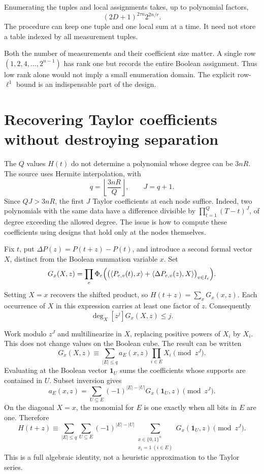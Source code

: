 \documentclass[11pt,a4paper]{article}
\numberwithin{equation}{section}
\theoremstyle{definition}
\theoremstyle{remark}
\newcommand{\one}{\mathbf 1}
\begin{document}
Enumerating the tuples and local assignments takes, up to polynomial factors,
\begin{equation}\label{eq:sep-cost}
 (2D+1)^{2\tau n}2^{2n/r}.
\end{equation}
The procedure can keep one tuple and one local sum at a time. It need not
store a table indexed by all measurement tuples.

Both the number of measurements and their coefficient size matter. A single
row $(1,2,4,\ldots,2^{n-1})$ has rank one but records the entire Boolean
assignment. Thus low rank alone would not imply a small enumeration domain.
The explicit row-$\ell^1$ bound is an indispensable part of the design.

\section{Recovering Taylor coefficients without destroying separation}
\label{sec:taylor}
The $Q$ values $H(t)$ do not determine a polynomial whose degree can be
$3nR$. The source uses Hermite interpolation, with
\[
 q=\left\lfloor\frac{3nR}{Q}\right\rfloor,\qquad J=q+1.
\]
Since $QJ>3nR$, the first $J$ Taylor coefficients at each node suffice.
Indeed, two polynomials with the same data have a difference divisible by
$\prod_{t=1}^Q(T-t)^J$, of degree exceeding the allowed degree.
The issue is how to compute these coefficients using designs that hold only
at the nodes themselves.

Fix $t$, put $\Delta P(z)=P(t+z)-P(t)$, and introduce a second formal vector
$X$, distinct from the Boolean summation variable $x$. Set
\[
 G_x(X,z)=\prod_e\Phi_e\Bigl(
 \bigl(\langle P_{e,v}(t),x\rangle+
 \langle\Delta P_{e,v}(z),X\rangle\bigr)_{v\in I_e}\Bigr).
\]
Setting $X=x$ recovers the shifted product, so
$H(t+z)=\sum_xG_x(x,z)$. Each occurrence of $X$ in this expression carries
at least one factor of $z$. Consequently
\begin{equation}\label{eq:taylor-degree}
 \deg_X[z^j]G_x(X,z)\le j.
\end{equation}

Work modulo $z^J$ and multilinearize in $X$, replacing positive powers of
$X_i$ by $X_i$. This does not change values on the Boolean cube. The result
can be written
\[
 G_x(X,z)\equiv\sum_{|E|\le q}a_E(x,z)\prod_{i\in E}X_i\pmod{z^J}.
\]
Evaluating at the Boolean vector $\one_U$ sums the coefficients whose supports
are contained in $U$. Subset inversion gives
\[
 a_E(x,z)=\sum_{U\subseteq E}(-1)^{|E|-|U|}G_x(\one_U,z)
                 \pmod{z^J}.
\]
On the diagonal $X=x$, the monomial for $E$ is one exactly when all bits in
$E$ are one. Therefore
\begin{equation}\label{eq:jetidentity}
 H(t+z)\equiv
 \sum_{|E|\le q}\sum_{U\subseteq E}(-1)^{|E|-|U|}
 \sum_{\substack{x\in\{0,1\}^n\\x_i=1\ (i\in E)}}
                         G_x(\one_U,z)\pmod{z^J}.
\end{equation}
This is a full algebraic identity, not a heuristic approximation to the
Taylor series.
\end{document}
